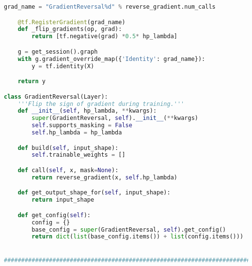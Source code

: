\begin{lstlisting}[language=Python]
    grad_name = "GradientReversal%d" % reverse_gradient.num_calls

    @tf.RegisterGradient(grad_name)
    def _flip_gradients(op, grad):
        return [tf.negative(grad) *0.5* hp_lambda]

    g = get_session().graph
    with g.gradient_override_map({'Identity': grad_name}):
        y = tf.identity(X)

    return y

class GradientReversal(Layer):
    '''Flip the sign of gradient during training.'''
    def __init__(self, hp_lambda, **kwargs):
        super(GradientReversal, self).__init__(**kwargs)
        self.supports_masking = False
        self.hp_lambda = hp_lambda

    def build(self, input_shape):
        self.trainable_weights = []

    def call(self, x, mask=None):
        return reverse_gradient(x, self.hp_lambda)

    def get_output_shape_for(self, input_shape):
        return input_shape

    def get_config(self):
        config = {}
        base_config = super(GradientReversal, self).get_config()
        return dict(list(base_config.items()) + list(config.items()))


##############################################################################################


\end{lstlisting}
